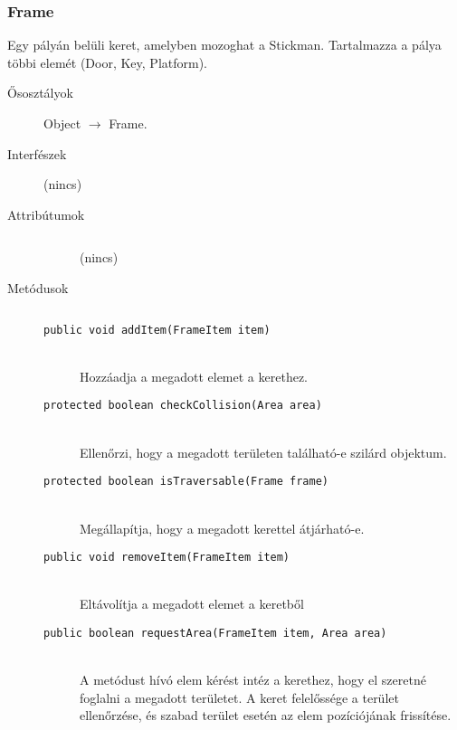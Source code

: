 		\subsubsection{Frame}
				 Egy pályán belüli keret, amelyben mozoghat a Stickman. Tartalmazza a pálya többi elemét (Door, Key, Platform). 			\begin{description}


				\item[Ősosztályok] Object $\rightarrow{}$ Frame.
				\item[Interfészek] (nincs)
				\item[Attribútumok]$\ $
					\begin{description}
						\item[] (nincs)
					\end{description}
				\item[Metódusok]$\ $
					\begin{description}
						\item[\texttt{public void addItem(FrameItem item)}] \hfill \\ Hozzáadja a megadott elemet a kerethez. 
						\item[\texttt{protected boolean checkCollision(Area area)}] \hfill \\ Ellenőrzi, hogy a megadott területen  található-e szilárd objektum. 
						\item[\texttt{protected boolean isTraversable(Frame frame)}] \hfill \\ Megállapítja, hogy a megadott kerettel  átjárható-e. 
						\item[\texttt{public void removeItem(FrameItem item)}] \hfill \\ Eltávolítja a megadott elemet a keretből 
						\item[\texttt{public boolean requestArea(FrameItem item, Area area)}] \hfill \\ A metódust hívó elem kérést intéz a kerethez,  hogy el szeretné foglalni a megadott területet.  A keret felelőssége a terület ellenőrzése, és szabad  terület esetén az elem pozíciójának frissítése. 
					\end{description}
			\end{description}

